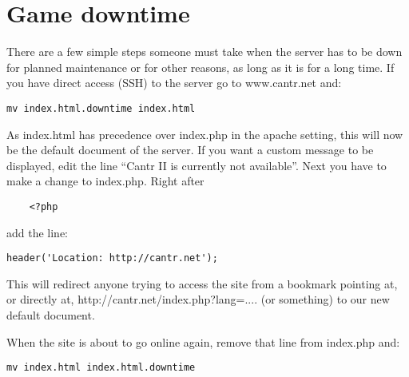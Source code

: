 \documentclass[a4paper,12pt]{article}
\begin{document}
\section{Game downtime}

There are a few simple steps someone must take when the server has to be down for planned maintenance or for other reasons, as long as it is for a long time.
If you have direct access (SSH) to the server go to www.cantr.net and:
\begin{verbatim}
mv index.html.downtime index.html
\end{verbatim}
As index.html has precedence over index.php in the apache setting, this will now be the default document of the server. If you want a custom message to be displayed, edit the line ``Cantr II is currently not available''. Next you have to make a change to index.php. Right after
\begin{verbatim}
	<?php
\end{verbatim}
add the line:
\begin{verbatim}
header('Location: http://cantr.net');
\end{verbatim}
This will redirect anyone trying to access the site from a bookmark pointing at, or directly at, http://cantr.net/index.php?lang=.... (or something) to our new default document.

When the site is about to go online again, remove that line from index.php and:
\begin{verbatim}
mv index.html index.html.downtime
\end{verbatim}
\end{document}
